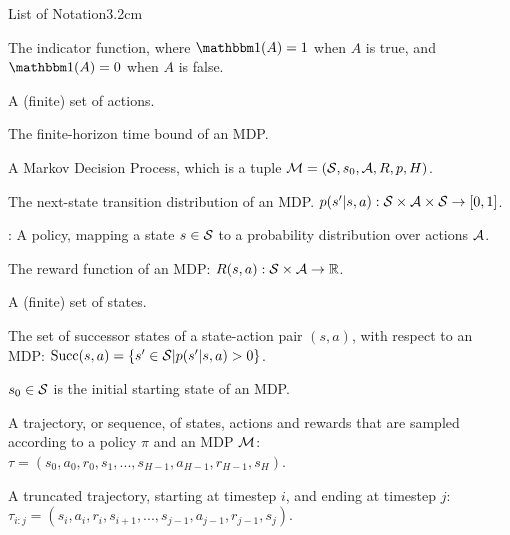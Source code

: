 
\begin{mclistof}{List of Notation}{3.2cm}


    \item[\Large\textbf{Global Notation}\hfill\hfill]
    \item[$\one$] 
        The indicator function, where $\one(A)=1$ when $A$ is true, and $\one(A)=0$ when $A$ is false. 
    \\
    \item[\Large\textbf{Markov Decision Processes (Section \ref{sec:2-1-mdps})}\hfill\hfill]
    \item[$\cl{A}$]
        A (finite) set of actions.
    \item[$H$]
        The finite-horizon time bound of an MDP.
    \item[$\cl{M}$]
        A Markov Decision Process, which is a tuple $\mathcal{M}=(\mathcal{S},s_0,\mathcal{A},R,p,H)$.
    \item[$p$] 
        The next-state transition distribution of an MDP.  $p(s' | s,a) : \mathcal{S} \times \mathcal{A} \times \mathcal{S} \rightarrow [0,1]$.
    \item[$\pi$]:
        A policy, mapping a state $s\in\mathcal{S}$ to a probability distribution over actions $\cl{A}$.
    \item[$R$] 
        The reward function of an MDP: $R(s,a) : \mathcal{S}\times \mathcal{A}\rightarrow \mathbb{R}$.
    \item[$\cl{S}$]
        A (finite) set of states.
    \item[$\suc(s,a)$]
        The set of successor states of a state-action pair $(s,a)$, with respect to an MDP: ${\textnormal{Succ}(s,a)}=\{s'\in\mathcal{S}|p(s'|s,a)>0\}$.
    \item[$s_0$]
        $s_0\in\mathcal{S}$ is the initial starting state of an MDP.
    \item[$\tau$]
        A trajectory, or sequence, of states, actions and rewards that are sampled according to a policy $\pi$ and an MDP $\cl{M}$: $\tau = (s_0, a_0, r_0, s_1, ..., s_{H-1}, a_{H-1}, r_{H-1}, s_H)$.
    \item[$\tau_{i:j}$]
        A truncated trajectory, starting at timestep $i$, and ending at timestep $j$: $\tau_{i:j} = (s_i, a_i, r_i, s_{i+1}, ..., s_{j-1}, a_{j-1}, r_{j-1}, s_j)$. 
    \\

\end{mclistof}
